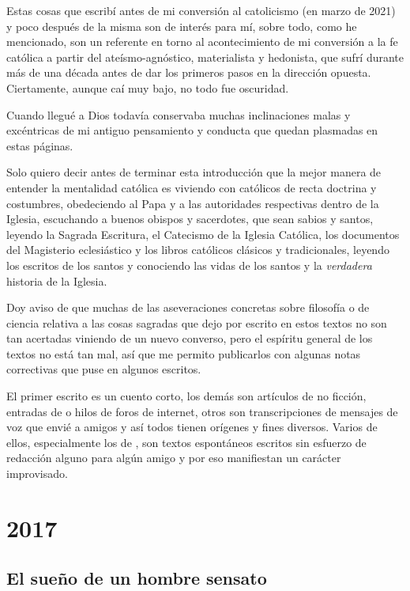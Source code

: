 \documentclass[12pt]{article}
\begin{document}
	Estas cosas que escribí antes de mi conversión al catolicismo (en marzo
	de 2021) y poco después de la misma son de interés
	 para mí, sobre todo, como he mencionado, son un
	referente en torno al acontecimiento de mi conversión a la fe católica a
	partir del ateísmo-agnóstico, materialista y hedonista, que sufrí
	durante más de una década antes de dar los primeros pasos en la
	dirección opuesta. Ciertamente, aunque caí muy bajo, no todo fue
	oscuridad.

	Cuando llegué a Dios todavía conservaba muchas inclinaciones malas y
	excéntricas de mi antiguo pensamiento y conducta que quedan plasmadas en
	estas páginas.

	Solo quiero decir antes de terminar esta introducción que la mejor
	manera de entender la mentalidad católica es viviendo con católicos de
	recta doctrina y costumbres, obedeciendo al Papa y a las autoridades
	respectivas dentro de la Iglesia, escuchando a buenos obispos y
	sacerdotes, que sean sabios y santos, leyendo la Sagrada Escritura, el
	Catecismo de la Iglesia Católica, los documentos del Magisterio
	eclesiástico y los libros católicos clásicos y tradicionales, leyendo 
	los escritos
	de los santos y conociendo las vidas de los santos y la
	\textit{verdadera} historia de la Iglesia.

	Doy aviso de que muchas de las aseveraciones concretas sobre filosofía o
	de ciencia relativa a las cosas sagradas que dejo por escrito en estos
	textos no son tan acertadas viniendo de un nuevo converso, pero el
	espíritu general de los textos no está tan mal, así que me permito
	publicarlos con algunas notas correctivas que puse en algunos
	escritos.\newline

	El primer escrito es un cuento corto, los demás son artículos de no
	ficción, entradas de  o hilos de foros de internet,
	otros son transcripciones de mensajes de voz que envié a amigos y así
	todos tienen orígenes y fines diversos. Varios de ellos, especialmente
	los de , son textos espontáneos escritos sin
	esfuerzo de redacción alguno para algún amigo y por eso manifiestan un
	carácter improvisado.

	\newpage

	\section{2017}

	\subsection{El sueño de un hombre sensato}
\end{document}

